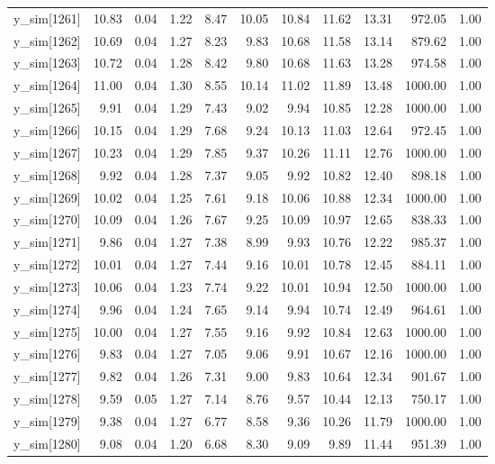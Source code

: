 \begin{table}[ht]
\begin{tabular}{rrrrrrrrrrr}
  y\_sim[1261] & 10.83 & 0.04 & 1.22 & 8.47 & 10.05 & 10.84 & 11.62 & 13.31 & 972.05 & 1.00 \\ 
  y\_sim[1262] & 10.69 & 0.04 & 1.27 & 8.23 & 9.83 & 10.68 & 11.58 & 13.14 & 879.62 & 1.00 \\ 
  y\_sim[1263] & 10.72 & 0.04 & 1.28 & 8.42 & 9.80 & 10.68 & 11.63 & 13.28 & 974.58 & 1.00 \\ 
  y\_sim[1264] & 11.00 & 0.04 & 1.30 & 8.55 & 10.14 & 11.02 & 11.89 & 13.48 & 1000.00 & 1.00 \\ 
  y\_sim[1265] & 9.91 & 0.04 & 1.29 & 7.43 & 9.02 & 9.94 & 10.85 & 12.28 & 1000.00 & 1.00 \\ 
  y\_sim[1266] & 10.15 & 0.04 & 1.29 & 7.68 & 9.24 & 10.13 & 11.03 & 12.64 & 972.45 & 1.00 \\ 
  y\_sim[1267] & 10.23 & 0.04 & 1.29 & 7.85 & 9.37 & 10.26 & 11.11 & 12.76 & 1000.00 & 1.00 \\ 
  y\_sim[1268] & 9.92 & 0.04 & 1.28 & 7.37 & 9.05 & 9.92 & 10.82 & 12.40 & 898.18 & 1.00 \\ 
  y\_sim[1269] & 10.02 & 0.04 & 1.25 & 7.61 & 9.18 & 10.06 & 10.88 & 12.34 & 1000.00 & 1.00 \\ 
  y\_sim[1270] & 10.09 & 0.04 & 1.26 & 7.67 & 9.25 & 10.09 & 10.97 & 12.65 & 838.33 & 1.00 \\ 
  y\_sim[1271] & 9.86 & 0.04 & 1.27 & 7.38 & 8.99 & 9.93 & 10.76 & 12.22 & 985.37 & 1.00 \\ 
  y\_sim[1272] & 10.01 & 0.04 & 1.27 & 7.44 & 9.16 & 10.01 & 10.78 & 12.45 & 884.11 & 1.00 \\ 
  y\_sim[1273] & 10.06 & 0.04 & 1.23 & 7.74 & 9.22 & 10.01 & 10.94 & 12.50 & 1000.00 & 1.00 \\ 
  y\_sim[1274] & 9.96 & 0.04 & 1.24 & 7.65 & 9.14 & 9.94 & 10.74 & 12.49 & 964.61 & 1.00 \\ 
  y\_sim[1275] & 10.00 & 0.04 & 1.27 & 7.55 & 9.16 & 9.92 & 10.84 & 12.63 & 1000.00 & 1.00 \\ 
  y\_sim[1276] & 9.83 & 0.04 & 1.27 & 7.05 & 9.06 & 9.91 & 10.67 & 12.16 & 1000.00 & 1.00 \\ 
  y\_sim[1277] & 9.82 & 0.04 & 1.26 & 7.31 & 9.00 & 9.83 & 10.64 & 12.34 & 901.67 & 1.00 \\ 
  y\_sim[1278] & 9.59 & 0.05 & 1.27 & 7.14 & 8.76 & 9.57 & 10.44 & 12.13 & 750.17 & 1.00 \\ 
  y\_sim[1279] & 9.38 & 0.04 & 1.27 & 6.77 & 8.58 & 9.36 & 10.26 & 11.79 & 1000.00 & 1.00 \\ 
  y\_sim[1280] & 9.08 & 0.04 & 1.20 & 6.68 & 8.30 & 9.09 & 9.89 & 11.44 & 951.39 & 1.00 \\ 

\end{tabular}
\end{table}
